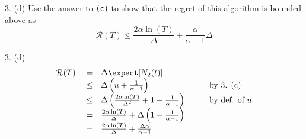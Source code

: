 \documentclass[11pt,a4paper]{article}
\begin{document}
\begin{question}{3. (d)}
  Use the answer to \texttt{(c)} to show that the regret of this algorithm is bounded above as
  \[ \mathcal{R}(T)\leq\frac{2\alpha\ln(T)}\Delta+\frac{\alpha}{\alpha-1}\Delta \]
\end{question}

\begin{answer}{3. (d)}
  \[\begin{array}{rrlcl}
  \mathcal{R}(T)&:=&\Delta\expect[N_2(t)]&\quad&\\
  &\leq&\Delta\left(u+\frac1{\alpha-1}\right)&&\text{by 3. (c)}\\
  &\leq&\Delta\left(\frac{2\alpha\ln(T)}{\Delta^2}+1+\frac1{\alpha-1}\right)&&\text{by def. of }u\\
  &=&\frac{2\alpha\ln(T)}{\Delta}+\Delta\left(1+\frac1{\alpha-1}\right)\\
  &=&\frac{2\alpha\ln(T)}{\Delta}+\frac{\Delta\alpha}{\alpha-1}\\
  \end{array}\]
\end{answer}
\end{document}
